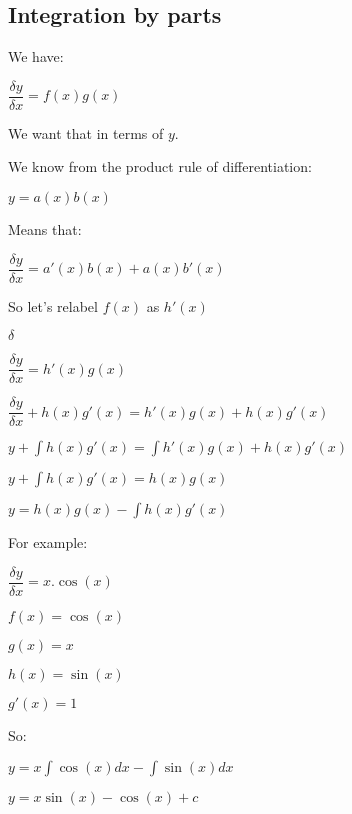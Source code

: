 
\subsection{Integration by parts}

We have:

\(\dfrac{\delta y}{\delta x}=f(x)g(x)\)

We want that in terms of \(y\).

We know from the product rule of differentiation:

\(y=a(x)b(x)\)

Means that:

\(\dfrac{\delta y}{\delta x}=a'(x)b(x)+a(x)b'(x)\)

So let's relabel \(f(x)\) as \(h'(x)\)

\(\delta\)

\(\dfrac{\delta y}{\delta x}=h'(x)g(x)\)

\(\dfrac{\delta y}{\delta x}+h(x)g'(x)=h'(x)g(x)+h(x)g'(x)\)

\(y+\int h(x)g'(x)=\int h'(x)g(x)+h(x)g'(x)\)

\(y+\int h(x)g'(x)=h(x)g(x)\)

\(y=h(x)g(x)-\int h(x)g'(x)\)

For example:

\(\dfrac{\delta y}{\delta x}=x.\cos(x)\)

\(f(x)=\cos(x)\)

\(g(x)=x\)

\(h(x)=\sin(x)\)

\(g'(x)=1\)

So:

\(y=x\int \cos(x) dx-\int \sin(x)dx\)

\(y=x\sin(x)-\cos(x)+c\)

